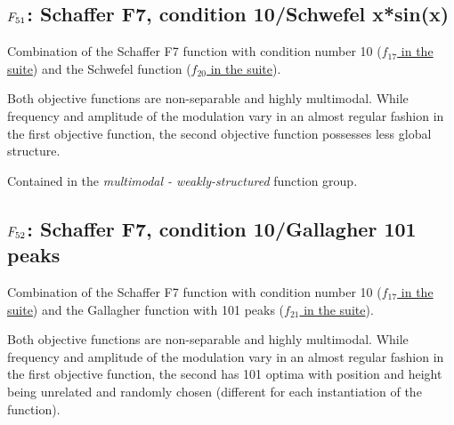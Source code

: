 

\subsection[\texorpdfstring{\protect\(F_{51}\protect\): Schaffer F7, condition 10/Schwefel x*sin(x)}{F51: Schaffer F7, condition 10/Schwefel x*sin(x)}]{\texorpdfstring{\protect\(F_{51}\protect\): Schaffer F7, condition 10/Schwefel x*sin(x)}{}}
\label{index:schaffer-f7-condition-10-schwefel-x-sin-x}\label{index:f51}
Combination of the Schaffer F7 function with
condition number 10 (\href{https://coco.gforge.inria.fr/downloads/download16.00/bbobdocfunctions.pdf\#page=85}{\(f_{17}\) in the \bbob suite})
and the Schwefel function (\href{https://coco.gforge.inria.fr/downloads/download16.00/bbobdocfunctions.pdf\#page=100}{\(f_{20}\) in the \bbob suite}).

Both objective functions are non-separable and highly multimodal.
While frequency and amplitude of the modulation vary in an almost
regular fashion in the first objective function, the second objective
function possesses less global structure.

Contained in the \emph{multimodal - weakly-structured} function group.



\subsection[\texorpdfstring{\protect\(F_{52}\protect\): Schaffer F7, condition 10/Gallagher 101 peaks}{F52: Schaffer F7, condition 10/Gallagher 101 peaks}]{\texorpdfstring{\protect\(F_{52}\protect\): Schaffer F7, condition 10/Gallagher 101 peaks}{}}
\label{index:schaffer-f7-condition-10-gallagher-101-peaks}\label{index:f52}
Combination of the Schaffer F7 function with
condition number 10 (\href{https://coco.gforge.inria.fr/downloads/download16.00/bbobdocfunctions.pdf\#page=85}{\(f_{17}\) in the \bbob suite})
and the Gallagher function with
101 peaks (\href{https://coco.gforge.inria.fr/downloads/download16.00/bbobdocfunctions.pdf\#page=105}{\(f_{21}\) in the \bbob suite}).

Both objective functions are non-separable and highly multimodal.
While frequency and amplitude of the modulation vary in an almost
regular fashion in the first objective function, the second has
101 optima with position and height being unrelated and randomly
chosen (different for each instantiation of the function).

